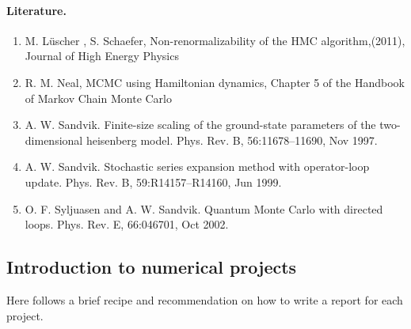 \documentclass[%
oneside,                 %
final,                   %
10pt]{article}
\begin{document}
\noindent
\paragraph{Literature.}
\begin{enumerate}
\item M. L{\"{u}}scher , S. Schaefer, Non-renormalizability of the HMC algorithm,(2011), Journal of High Energy Physics

\item R. M. Neal, MCMC using Hamiltonian dynamics, Chapter 5 of the Handbook of Markov Chain Monte Carlo

\item A. W. Sandvik. Finite-size scaling of the ground-state parameters of the two-dimensional heisenberg model. Phys. Rev. B, 56:11678–11690, Nov 1997.

\item A. W. Sandvik. Stochastic series expansion method with operator-loop update. Phys. Rev. B, 59:R14157–R14160, Jun 1999.

\item O. F. Syljuasen and A. W. Sandvik. Quantum Monte Carlo with directed loops. Phys. Rev. E, 66:046701, Oct 2002.~
\end{enumerate}

\noindent
\subsection{Introduction to numerical projects}

Here follows a brief recipe and recommendation on how to write a report for each
project.
\end{document}

